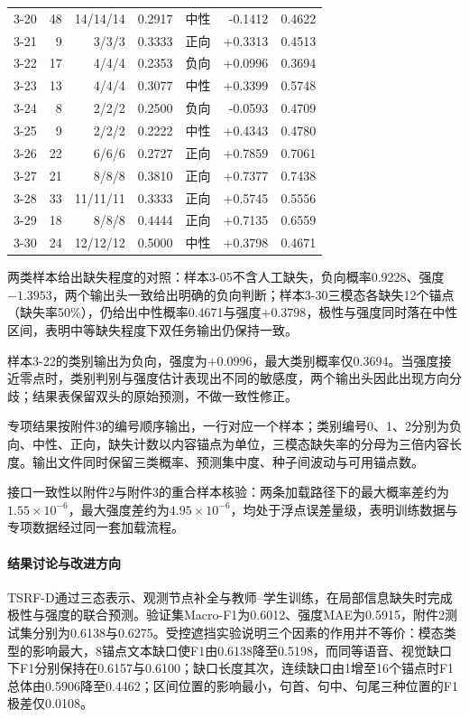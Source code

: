 {\begin{longtable}{lrrrrrr}
3-20 & 48 & 14/14/14 & 0.2917 & 中性 & -0.1412 & 0.4622 \\
3-21 & 9 & 3/3/3 & 0.3333 & 正向 & +0.3313 & 0.4513 \\
3-22 & 17 & 4/4/4 & 0.2353 & 负向 & +0.0996 & 0.3694 \\
3-23 & 13 & 4/4/4 & 0.3077 & 中性 & +0.3399 & 0.5748 \\
3-24 & 8 & 2/2/2 & 0.2500 & 负向 & -0.0593 & 0.4709 \\
3-25 & 9 & 2/2/2 & 0.2222 & 中性 & +0.4343 & 0.4780 \\
3-26 & 22 & 6/6/6 & 0.2727 & 正向 & +0.7859 & 0.7061 \\
3-27 & 21 & 8/8/8 & 0.3810 & 正向 & +0.7377 & 0.7438 \\
3-28 & 33 & 11/11/11 & 0.3333 & 正向 & +0.5745 & 0.5556 \\
3-29 & 18 & 8/8/8 & 0.4444 & 正向 & +0.7135 & 0.6559 \\
3-30 & 24 & 12/12/12 & 0.5000 & 中性 & +0.3798 & 0.4671 \\
\end{longtable}
}
两类样本给出缺失程度的对照：样本3-05不含人工缺失，负向概率0.9228、强度$-1.3953$，两个输出头一致给出明确的负向判断；样本3-30三模态各缺失12个锚点（缺失率50\%），仍给出中性概率0.4671与强度$+0.3798$，极性与强度同时落在中性区间，表明中等缺失程度下双任务输出仍保持一致。

样本3-22的类别输出为负向，强度为$+0.0996$，最大类别概率仅0.3694。当强度接近零点时，类别判别与强度估计表现出不同的敏感度，两个输出头因此出现方向分歧；结果表保留双头的原始预测，不做一致性修正。

专项结果按附件3的编号顺序输出，一行对应一个样本；类别编号0、1、2分别为负向、中性、正向，缺失计数以内容锚点为单位，三模态缺失率的分母为三倍内容长度。输出文件同时保留三类概率、预测集中度、种子间波动与可用锚点数。

接口一致性以附件2与附件3的重合样本核验：两条加载路径下的最大概率差约为$1.55\times10^{-6}$，最大强度差约为$4.95\times10^{-6}$，均处于浮点误差量级，表明训练数据与专项数据经过同一套加载流程。

\FloatBarrier
\paragraph{结果讨论与改进方向}
TSRF-D通过三态表示、观测节点补全与教师--学生训练，在局部信息缺失时完成极性与强度的联合预测。验证集Macro-F1为0.6012、强度MAE为0.5915，附件2测试集分别为0.6138与0.6275。受控遮挡实验说明三个因素的作用并不等价：模态类型的影响最大，8锚点文本缺口使F1由0.6138降至0.5198，而同等语音、视觉缺口下F1分别保持在0.6157与0.6100；缺口长度其次，连续缺口由1增至16个锚点时F1总体由0.5906降至0.4462；区间位置的影响最小，句首、句中、句尾三种位置的F1极差仅0.0108。

